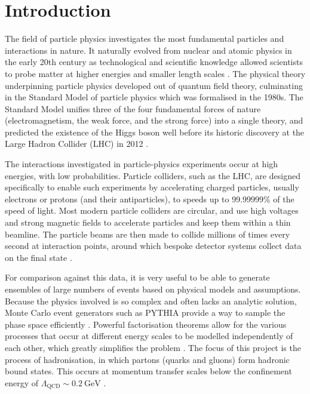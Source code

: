 \documentclass[12pt,a4paper]{report}
\begin{document}
\chapter{Introduction}
The field of particle physics investigates the most fundamental particles and interactions in nature. It naturally evolved from nuclear and atomic physics in the early 20th century as technological and scientific knowledge allowed scientists to probe matter at higher energies and smaller length scales \cite{ParticleDataGroup:2024cfk,Gross:2022hyw}. The physical theory underpinning particle physics developed out of quantum field theory, culminating in the Standard Model of particle physics which was formalised in the 1980s. The Standard Model unifies three of the four fundamental forces of nature (electromagnetism, the weak force, and the strong force) into a single theory, and predicted the existence of the Higgs boson well before its historic discovery at the Large Hadron Collider (LHC) in 2012 \cite{Schwartz:2014sze,ATLAS:2012yve,CMS:2012qbp}.

The interactions investigated in particle-physics experiments occur at high energies, with low probabilities. Particle colliders, such as the LHC, are designed specifically to enable such experiments by accelerating charged particles, usually electrons or protons (and their antiparticles), to speeds up to 99.99999\% of the speed of light. Most modern particle colliders are circular, and use high voltages and strong magnetic fields to accelerate particles and keep them within a thin beamline. The particle beams are then made to collide millions of times every second at interaction points, around which bespoke detector systems collect data on the final state \cite{ParticleDataGroup:2024cfk,Ellis:1996mzs,Evans:2008zzb}.

For comparison against this data, it is very useful to be able to generate ensembles of large numbers of events based on physical models and assumptions. Because the physics involved is so complex and often lacks an analytic solution, Monte Carlo event generators such as PYTHIA provide a way to sample the phase space efficiently \cite{ParticleDataGroup:2024cfk, Bierlich:2022pfr, Buckley:2011ms, Skands:2012ts}. Powerful factorisation theorems allow for the various processes that occur at different energy scales to be modelled independently of each other, which greatly simplifies the problem \cite{Collins:1981uw, Skands:2012ts}. The focus of this project is the process of hadronisation, in which partons (quarks and gluons) form hadronic bound states. This occurs at momentum transfer scales below the confinement energy of $\Lambda_\text{QCD} \sim \qty{0.2}{\giga\electronvolt}$ \cite{Skands:2012ts}.
\end{document}
